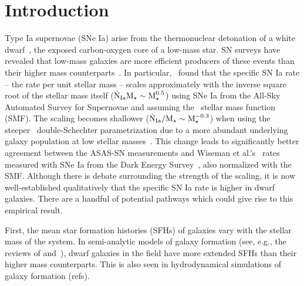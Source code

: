 \documentclass[ms.tex]{subfiles}
\begin{document}
\section{Introduction}
\label{sec:intro}

Type Ia supernovae (SNe Ia) arise from the thermonuclear detonation of a white
dwarf~\citep[WD;][]{Hoyle1960, Colgate1969}, the exposed carbon-oxygen core of
a low-mass star.
SN surveys have revealed that low-mass galaxies are more efficient producers
of these events than their higher mass counterparts~\citep[e.g.,][]{Mannucci2005,
Sullivan2006, Li2011, Smith2012}.
In particular,~\citet{Brown2019} found that the specific SN Ia rate -- the rate
per unit stellar mass -- scales approximately with the inverse square root of
the stellar mass itself ($\dot{\text{N}}_\text{Ia} \text{M}_\star \sim \text{M}_\star^{0.5}$)
using SNe Ia from the All-Sky Automated Survey for Supernovae
\citep[ASAS-SN;][]{Shappee2014, Kochanek2017} and assuming the~\citet{Bell2003}
stellar mass function (SMF).
The scaling becomes shallower ($\dot{\text{N}}_\text{Ia} / \text{M}_\star \sim
\text{M}_\star^{-0.3}$) when using the steeper~\citet{Baldry2012} double-Schechter
parametrization due to a more abundant underlying galaxy population at low
stellar masses~\citep{Gandhi2022}.
This change leads to significantly better agreement between the ASAS-SN
measurements and Wiseman et al.'s~\citeyearpar{Wiseman2021} rates measured with
SNe Ia from the Dark Energy Survey~\citep[DES;][]{DES2016}, also normalized
with the~\citet{Baldry2012} SMF.
Although there is debate surrounding the strength of the scaling, it is now
well-established qualitatively that the specific SN Ia rate is higher in dwarf
galaxies.
There are a handful of potential pathways which could give rise to this
empirical result.
\par
First, the mean star formation histories (SFHs) of galaxies vary with the
stellar mass of the system.
In semi-analytic models of galaxy formation (see, e.g., the reviews of
\citealt{Baugh2006} and~\citealt{Somerville2015a}), dwarf galaxies in the field
have more extended SFHs than their higher mass counterparts.
{\color{red} This is also seen in hydrodynamical simulations of galaxy
formation (refs).}
\end{document}
